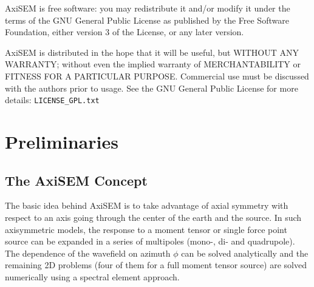 \documentclass{article}
\begin{document}
AxiSEM is free software: you may redistribute it and/or modify it
under the terms of the GNU General Public License as published by the
Free Software Foundation, either version 3 of the License, or any
later version.

AxiSEM is distributed in the hope that it will be useful, but WITHOUT
ANY WARRANTY; without even the implied warranty of MERCHANTABILITY or
FITNESS FOR A PARTICULAR PURPOSE. Commercial use must be discussed
with the authors prior to usage. See the GNU General Public License
for more details: \verb|LICENSE_GPL.txt|
\newpage
\tableofcontents
%
\vspace*{1cm}

\section{Preliminaries}

\subsection{The AxiSEM Concept}

The basic idea behind AxiSEM is to take advantage of axial symmetry with respect
to an axis going through the center of the earth and the source. In such axisymmetric 
models, the response to a moment tensor or single force point source can be expanded in a
series of multipoles (mono-, di- and quadrupole). The dependence of the wavefield on
azimuth $\phi$ can be solved analytically and the remaining 2D problems (four of them for
a full moment tensor source) are solved numerically using a spectral
element approach.\\
\end{document}
